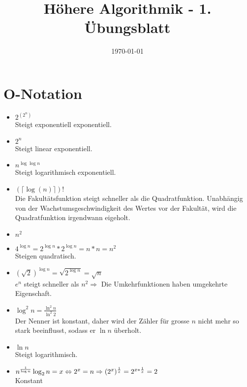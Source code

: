 \documentclass[a4paper,10pt]{scrartcl}
\title{H\"ohere Algorithmik - 1. \"Ubungsblatt}
\author{\Authors}
\date{\today}
\begin{document}
\maketitle

\section{$\boldsymbol{O}$-Notation}
\begin{itemize}
	\item $2^{(2^n)}$\\
		Steigt exponentiell exponentiell.
	\item $2^n$\\
		Steigt linear exponentiell.
	\item $n^{\log \log n}$\\
		Steigt logarithmisch exponentiell.
	\item $(\lceil \log (n) \rceil )!$\\
		Die Fakult\"atsfunktion steigt schneller als die Quadratfunktion. Unabh\"angig von der Wachstumsgeschwindigkeit des Wertes vor der Fakult\"at, wird die Quadratfunktion irgendwann eigeholt.
	\item $n^2$
	\item $4^{\log n} = 2^{\log n} * 2^{\log n} = n * n = n^2$\\
		Steigen quadratisch.
	\item $(\sqrt{2})^{\log n} = \sqrt{2^{\log n}} = \sqrt{n}$\\
		$e^{n}$ steigt schneller als $n^2 \Rightarrow$ Die Umkehrfunktionen haben umgekehrte Eigenschaft.
	\item $\log^2 n = \frac{\ln^2 n}{\ln^2 2}$\\
		Der Nenner ist konstant, daher wird der Z\"ahler f\"ur grosse $n$ nicht mehr so stark beeinflusst, sodass er $\ln n$ \"uberholt.
	\item $\ln n$\\
		Steigt logarithmisch.
	\item $n^{\frac{1}{\log n}}\\
		\log_2 n = x \Leftrightarrow 2^x = n\\
		\Rightarrow (2^x)^{\frac{1}{x}} = 2^{x * \frac{1}{x}} = 2$\\
			Konstant
\end{itemize}
\end{document}
